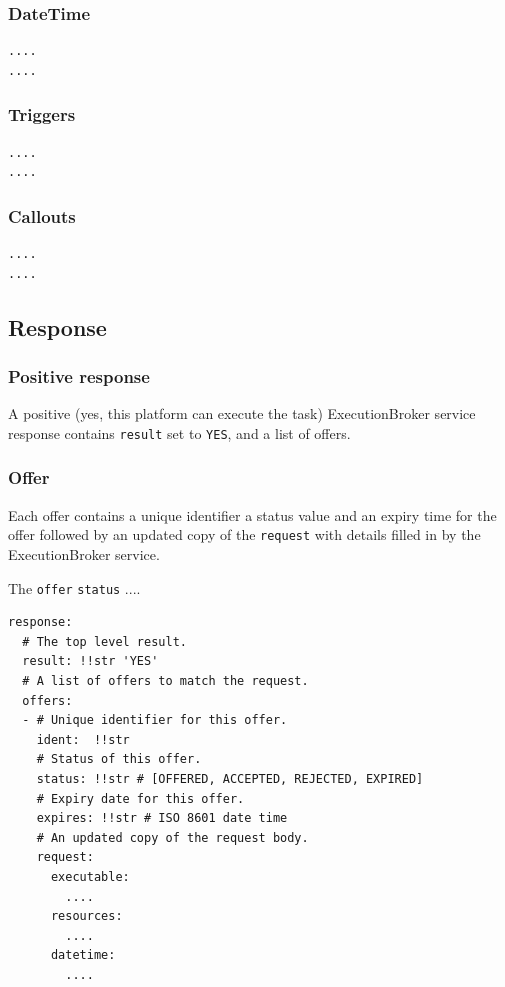 \documentclass[11pt,a4paper]{ivoa}
\newcommand{\execbrokerclass} {ExecutionBroker}
\newcommand{\codeword}[1] {\texttt{#1}}
\begin{document}
\subsubsection{DateTime}
\label{datamodel-datetime}

\begin{lstlisting}[]
....
....
\end{lstlisting}

\subsubsection{Triggers}
\label{datamodel-triggers}

\begin{lstlisting}[]
....
....
\end{lstlisting}

\subsubsection{Callouts}
\label{datamodel-callouts}

\begin{lstlisting}[]
....
....
\end{lstlisting}

\subsection{Response}
\label{datamodel-response}

\subsubsection{Positive response}
\label{datamodel-positive-response}
A positive (yes, this platform can execute the task) \execbrokerclass{} service response contains \codeword{result}
set to \codeword{YES}, and a list of offers.

\subsubsection{Offer}
\label{datamodel-offer}

Each offer contains a unique identifier a status value and an expiry time for the offer
followed by an updated copy of the \codeword{request} with details
filled in by the \execbrokerclass{} service.

The \codeword{offer} \codeword{status} ....

\begin{lstlisting}[]
response:
  # The top level result.
  result: !!str 'YES'
  # A list of offers to match the request.
  offers:
  - # Unique identifier for this offer.
    ident:  !!str
    # Status of this offer.
    status: !!str # [OFFERED, ACCEPTED, REJECTED, EXPIRED]
    # Expiry date for this offer.
    expires: !!str # ISO 8601 date time
    # An updated copy of the request body.
    request:
      executable:
        ....
      resources:
        ....
      datetime:
        ....
\end{lstlisting}
\end{document}
